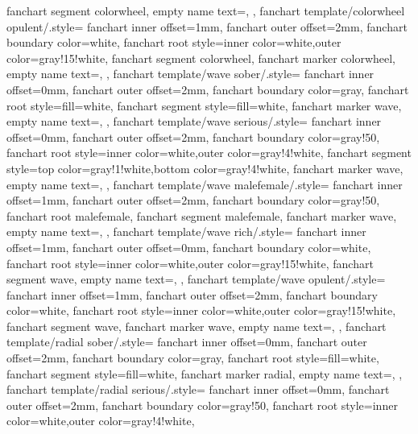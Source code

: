 {{        fanchart segment colorwheel,
        empty name text={},
      },
    fanchart template/colorwheel opulent/.style=
      {
        fanchart inner offset={1mm},
        fanchart outer offset={2mm},
        fanchart boundary color=white,
        fanchart root style={inner color=white,outer color=gray!15!white},
        fanchart segment colorwheel,
        fanchart marker colorwheel,
        empty name text={},
      },
%
    fanchart template/wave sober/.style=
      {
        fanchart inner offset={0mm},
        fanchart outer offset={2mm},
        fanchart boundary color=gray,
        fanchart root style={fill=white},
        fanchart segment style={fill=white},
        fanchart marker wave,
        empty name text={},
      },
    fanchart template/wave serious/.style=
      {
        fanchart inner offset={0mm},
        fanchart outer offset={2mm},
        fanchart boundary color=gray!50,
        fanchart root style={inner color=white,outer color=gray!4!white},
        fanchart segment style={top color=gray!1!white,bottom color=gray!4!white},
        fanchart marker wave,
        empty name text={},
      },
    fanchart template/wave malefemale/.style=
      {
        fanchart inner offset={1mm},
        fanchart outer offset={2mm},
        fanchart boundary color=gray!50,
        fanchart root malefemale,
        fanchart segment malefemale,
        fanchart marker wave,
        empty name text={},
      },
    fanchart template/wave rich/.style=
      {
        fanchart inner offset={1mm},
        fanchart outer offset={0mm},
        fanchart boundary color=white,
        fanchart root style={inner color=white,outer color=gray!15!white},
        fanchart segment wave,
        empty name text={},
      },
    fanchart template/wave opulent/.style=
      {
        fanchart inner offset={1mm},
        fanchart outer offset={2mm},
        fanchart boundary color=white,
        fanchart root style={inner color=white,outer color=gray!15!white},
        fanchart segment wave,
        fanchart marker wave,
        empty name text={},
      },
    fanchart template/radial sober/.style=
      {
        fanchart inner offset={0mm},
        fanchart outer offset={2mm},
        fanchart boundary color=gray,
        fanchart root style={fill=white},
        fanchart segment style={fill=white},
        fanchart marker radial,
        empty name text={},
      },
    fanchart template/radial serious/.style=
      {
        fanchart inner offset={0mm},
        fanchart outer offset={2mm},
        fanchart boundary color=gray!50,
        fanchart root style={inner color=white,outer color=gray!4!white},
}}
